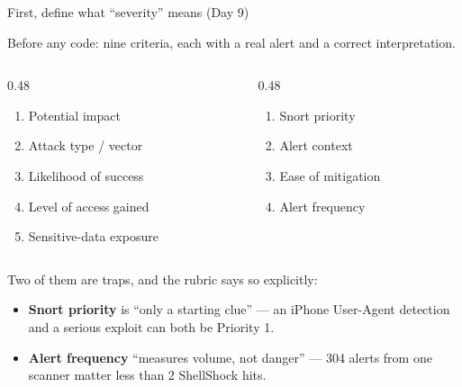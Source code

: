 \documentclass[aspectratio=169,11pt]{beamer}
\newcommand{\lede}[1]{{\color{soft}\small #1\par\medskip}}
\begin{document}
\begin{frame}{First, define what ``severity'' means (Day 9)}
  \lede{Before any code: nine criteria, each with a real alert and a correct interpretation.}
  \begin{columns}[T,onlytextwidth]
    \begin{column}{0.48\textwidth}
      {\small
      \begin{enumerate}\setlength{\itemsep}{1pt}
        \item Potential impact
        \item Attack type / vector
        \item Likelihood of success
        \item Level of access gained
        \item Sensitive-data exposure
      \end{enumerate}}
    \end{column}
    \begin{column}{0.48\textwidth}
      {\small
      \begin{enumerate}\setlength{\itemsep}{1pt}\setcounter{enumi}{5}
        \item Snort priority
        \item Alert context
        \item Ease of mitigation
        \item Alert frequency
      \end{enumerate}}
    \end{column}
  \end{columns}
  \vspace{0.9em}
  {\small Two of them are traps, and the rubric says so explicitly:}
  \begin{itemize}
    \item {\small \textbf{Snort priority} is ``only a starting clue'' --- an iPhone User-Agent detection and a serious exploit can both be Priority 1.}
    \item {\small \textbf{Alert frequency} ``measures volume, not danger'' --- 304 alerts from one scanner matter less than 2 ShellShock hits.}
  \end{itemize}
\end{frame}
\end{document}

